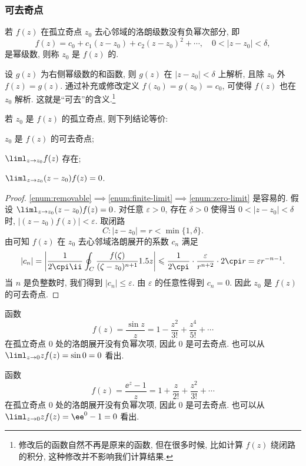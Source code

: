 \subsubsection{可去奇点}

\begin{definition}
  若 $f(z)$ 在孤立奇点 $z_0$ 去心邻域的洛朗级数没有负幂次部分, 即
  \[f(z)=c_0+c_1(z-z_0)+c_2(z-z_0)^2+\cdots,\quad 0<|z-z_0|<\delta,\]
  是幂级数, 则称 $z_0$ 是 $f(z)$ 的.
\end{definition}

设 $g(z)$ 为右侧幂级数的和函数, 则 $g(z)$ 在 $|z-z_0|<\delta$ 上解析,
且除 $z_0$ 外 $f(z)=g(z)$.
通过补充或修改定义 $f(z_0)=g(z_0)=c_0$, 可使得 $f(z)$ 也在 $z_0$ 解析.
这就是``可去''的含义.\footnote{
  修改后的函数自然不再是原来的函数, 但在很多时候, 比如计算 $f(z)$ 绕闭路的积分, 这种修改并不影响我们计算结果.
}

\begin{theorem}
  \label{thm:test-removable}
  若 $z_0$ 是 $f(z)$ 的孤立奇点, 则下列结论等价:
  \begin{enumpar}
    \item $z_0$ 是 $f(z)$ 的可去奇点;
    \label{enum:removable}
    \item $\liml_{z\ra z_0}f(z)$ 存在;
    \label{enum:finite-limit}
    \item $\liml_{z\ra z_0}(z-z_0)f(z)=0$.
    \label{enum:zero-limit}
  \end{enumpar}
\end{theorem}

\begin{proof}
  \ref{enum:removable}$\implies$\ref{enum:finite-limit}$\implies$\ref{enum:zero-limit} 是容易的.
  假设 $\liml_{z\ra z_0}(z-z_0)f(z)=0$.
  对任意 $\varepsilon>0$, 存在 $\delta>0$ 使得当 $0<|z-z_0|<\delta$ 时, $|(z-z_0)f(z)|<\varepsilon$.
  取闭路
  \[
    C:|z-z_0|=r<\min\{1,\delta\}.
  \]
  由\thmGrowUp 可知 $f(z)$ 在 $z_0$ 去心邻域洛朗展开的系数 $c_n$ 满足
  \[
     |c_n|
    =\abs{\frac1{2\cpi\ii}\oint_C \frac{f(\zeta)}{(\zeta-z_0)^{n+1}}\d z}
    \le \frac1{2\cpi} \cdot\frac{\varepsilon}{r^{n+2}}\cdot 2\cpi r
    =\varepsilon r^{-n-1}.
  \]
  当 $n$ 是负整数时, 我们得到 $|c_n|\le \varepsilon$.
  由 $\varepsilon$ 的任意性得到 $c_n=0$.
  因此 $z_0$ 是 $f(z)$ 的可去奇点.
\end{proof}

\begin{example}\delspace
  \begin{enumnopar}[(i)]
    \item 函数
      \[
        f(z)=\frac{\sin z}z=1-\dfrac{z^2}{3!}+\dfrac{z^4}{5!}+\cdots
      \]
      在孤立奇点 $0$ 处的洛朗展开没有负幂次项, 因此 $0$ 是可去奇点.
      也可以从 $\liml_{z\ra0}zf(z)=\sin 0=0$ 看出.
    \item 函数
      \[
        f(z)=\frac{\ee^z-1}z=1+\dfrac z{2!}+\dfrac{z^2}{3!}+\cdots
      \]
      在孤立奇点 $0$ 处的洛朗展开没有负幂次项, 因此 $0$ 是可去奇点.
      也可以从 $\liml_{z\ra0}zf(z)=\ee^0-1=0$ 看出.
  \end{enumnopar}
\end{example}

